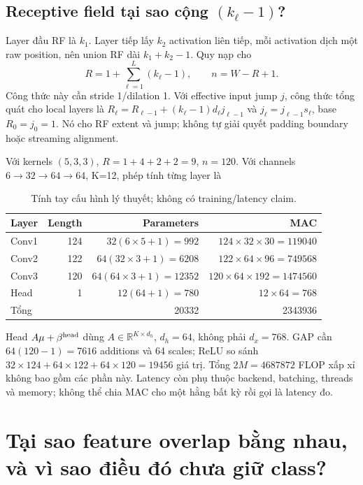 \documentclass[11pt,a4paper]{article}
\newcommand{\R}{\mathbb R}
\theoremstyle{definition}
\begin{document}
\subsection{Receptive field tại sao cộng $(k_\ell-1)$?}
Layer đầu RF là $k_1$. Layer tiếp lấy $k_2$ activation liên tiếp, mỗi activation
dịch một raw position, nên union RF dài $k_1+k_2-1$. Quy nạp cho
\begin{equation}
R=1+\sum_{\ell=1}^L(k_\ell-1),\qquad n=W-R+1.
\end{equation}
Công thức này cần stride 1/dilation 1. Với effective input jump $j$,
công thức tổng quát cho local layers là
$R_\ell=R_{\ell-1}+(k_\ell-1)d_\ell j_{\ell-1}$ và
$j_\ell=j_{\ell-1}s_\ell$, base $R_0=j_0=1$. Nó cho RF extent và jump;
không tự giải quyết padding boundary hoặc streaming alignment.

Với kernels $(5,3,3)$, $R=1+4+2+2=9$, $n=120$. Với channels
$6\to32\to64\to64$, K=12, phép tính từng layer là
\begin{table}[!htbp]\centering\small
\caption{Tính tay cấu hình lý thuyết; không có training/latency claim.}
\begin{tabularx}{\linewidth}{@{}Yrrr@{}}\toprule
Layer & Length & Parameters & MAC\\\midrule
Conv1 &124&$32(6\times5+1)=992$&$124\times32\times30=119040$\\
Conv2 &122&$64(32\times3+1)=6208$&$122\times64\times96=749568$\\
Conv3 &120&$64(64\times3+1)=12352$&$120\times64\times192=1474560$\\
Head &1&$12(64+1)=780$&$12\times64=768$\\\midrule
Tổng &&20332&2343936\\\bottomrule
\end{tabularx}
\end{table}
Head $A\mu+\beta^{\rm head}$ dùng $A\in\R^{K\times d_h}$,
$d_h=64$, không phải $d_x=768$. GAP cần $64(120-1)=7616$ additions và
64 scales; ReLU so sánh $32\times124+64\times122+64\times120=19456$
giá trị. Tổng $2M=4687872$ FLOP xấp xỉ không bao gồm các phần này.
Latency còn phụ thuộc backend, batching, threads và memory; không thể chia
MAC cho một hằng bất kỳ rồi gọi là latency đo.

\section{Tại sao feature overlap bằng nhau, và vì sao điều đó chưa giữ class?}
\end{document}
